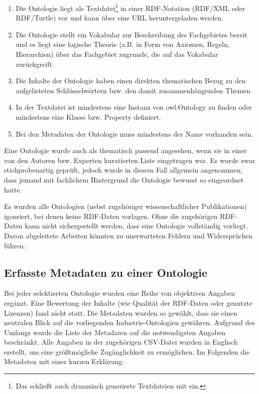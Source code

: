 \documentclass{article}
\begin{document}
\begin{enumerate}
    \item Die Ontologie liegt als Textdatei\footnote{Das schließt auch dynamisch generierte Textdateien mit ein.} in einer RDF-Notation (RDF/XML oder RDF/Turtle) vor und kann über eine URL heruntergeladen werden.
    \item Die Ontologie stellt ein Vokabular zur Beschreibung des Fachgebietes bereit und es liegt eine logische Theorie (z.B. in Form von Axiomen, Regeln, Hierarchien) über das Fachgebiet zugrunde, die auf das Vokabular zurückgreift.
    \item Die Inhalte der Ontologie haben einen direkten thematischen Bezug zu den aufgelisteten Schlüsselwörtern bzw. den damit zusammenhängenden Themen.
    \item In der Textdatei ist mindestens eine Instanz von owl:Ontology zu finden oder mindestens eine Klasse bzw. Property definiert.
    \item Bei den Metadaten der Ontologie muss mindestens der Name vorhanden sein.
\end{enumerate}

Eine Ontologie wurde auch als thematisch passend angesehen, wenn sie in einer von den Autoren bzw. Experten kuratierten Liste eingetragen war.
Es wurde zwar stichprobenartig geprüft, jedoch wurde in diesem Fall allgemein angenommen, dass jemand mit fachlichem Hintergrund die Ontologie bewusst so eingeordnet hatte.

Es wurden alle Ontologien (nebst zugehöriger wissenschaftlicher Publikationen) igonriert, bei denen keine RDF-Daten vorlagen. Ohne die zugehörigen RDF-Daten kann nicht sichergestellt werden, dass eine Ontologie vollständig vorliegt. Davon abgeleitete Arbeiten könnten zu unerwarteten Fehlern und Widersprüchen führen.

\subsection{Erfasste Metadaten zu einer Ontologie}

Bei jeder selektierten Ontologie wurden eine Reihe von objektiven Angaben ergänzt.
Eine Bewertung der Inhalte (wie Qualität der RDF-Daten oder genutzte Lizenzen) fand nicht statt.
Die Metadaten wurden so gewählt, dass sie einen neutralen Blick auf die vorliegenden Industrie-Ontologien gewähren.
Aufgrund des Umfangs wurde die Liste der Metadaten auf die notwendigsten Angaben beschränkt.
Alle Angaben in der zugehörigen CSV-Datei wurden in Englisch erstellt, um eine größtmögliche Zugänglichkeit zu ermöglichen.
Im Folgenden die Metadaten mit einer kurzen Erklärung:
\end{document}
